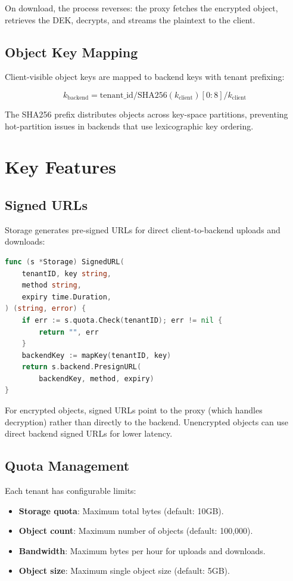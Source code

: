 \documentclass[11pt,twocolumn]{article}
\begin{document}
On download, the process reverses: the proxy fetches the encrypted object, retrieves the DEK, decrypts, and streams the plaintext to the client.

\subsection{Object Key Mapping}

Client-visible object keys are mapped to backend keys with tenant prefixing:

\begin{equation}
    k_{\text{backend}} = \text{tenant\_id} / \text{SHA256}(k_{\text{client}}) [0:8] / k_{\text{client}}
\end{equation}

The SHA256 prefix distributes objects across key-space partitions, preventing hot-partition issues in backends that use lexicographic key ordering.

\section{Key Features}

\subsection{Signed URLs}

Storage generates pre-signed URLs for direct client-to-backend uploads and downloads:

\begin{lstlisting}[language=Go]
func (s *Storage) SignedURL(
    tenantID, key string,
    method string,
    expiry time.Duration,
) (string, error) {
    if err := s.quota.Check(tenantID); err != nil {
        return "", err
    }
    backendKey := mapKey(tenantID, key)
    return s.backend.PresignURL(
        backendKey, method, expiry)
}
\end{lstlisting}

For encrypted objects, signed URLs point to the proxy (which handles decryption) rather than directly to the backend. Unencrypted objects can use direct backend signed URLs for lower latency.

\subsection{Quota Management}

Each tenant has configurable limits:

\begin{itemize}
    \item \textbf{Storage quota}: Maximum total bytes (default: 10GB).
    \item \textbf{Object count}: Maximum number of objects (default: 100,000).
    \item \textbf{Bandwidth}: Maximum bytes per hour for uploads and downloads.
    \item \textbf{Object size}: Maximum single object size (default: 5GB).
\end{itemize}
\end{document}
